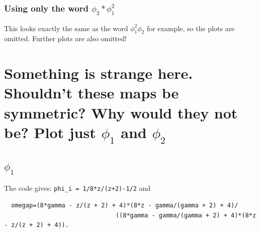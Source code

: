 \documentclass[a4paper,10pt]{article}
\begin{document}
 \subsubsection{Using only the word $\phi_2*\phi_1^2$}
 This looks exactly the same as the word $\phi_1^2\phi_2$ for example, so the plots are omitted. Further plots are also omitted!
 

 \section{Something is strange here. Shouldn't these maps be symmetric? Why would they not be? Plot just $\phi_1$ and $\phi_2$}
 \subsection{$\phi_1$}
 The code gives: \verb?phi_i = 1/8*z/(z+2)-1/2? and
 \begin{verbatim}
  omegap=(8*gamma - z/(z + 2) + 4)*(8*z - gamma/(gamma + 2) + 4)/
	                           ((8*gamma - gamma/(gamma + 2) + 4)*(8*z - z/(z + 2) + 4)).
 \end{verbatim}
 
\end{document}

